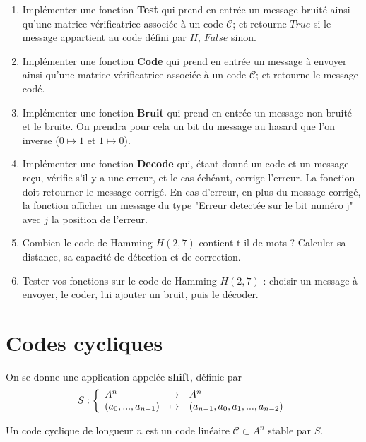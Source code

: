 \begin{enumerate}
\item Implémenter une fonction \textbf{Test} qui prend en entrée un message bruité ainsi qu'une matrice vérificatrice associée à un code $\mathcal C$; et retourne $True$ si le message appartient au code défini par $H$, $False$ sinon.
\item Implémenter une fonction \textbf{Code} qui prend en entrée un message à envoyer ainsi qu'une matrice vérificatrice associée à un code $\mathcal C$; et retourne le message codé.
\item Implémenter une fonction \textbf{Bruit} qui prend en entrée un message non bruité et le bruite. On prendra pour cela un bit du message au hasard que l'on inverse ($0\mapsto 1$ et $1\mapsto 0$).
\item Implémenter une fonction \textbf{Decode} qui, étant donné un code et un message reçu, vérifie s'il y a une erreur, et le cas échéant, corrige l'erreur. La fonction doit retourner le message corrigé. En cas d'erreur, en plus du message corrigé, la fonction afficher un message du type "Erreur detectée sur le bit numéro j" avec $j$ la position de l'erreur.
\item Combien le code de Hamming $H(2,7)$ contient-t-il de mots ? Calculer sa distance, sa capacité de détection et de correction.
\item Tester vos fonctions sur le code de Hamming $H(2,7)$ : choisir un message à envoyer, le coder, lui ajouter un bruit, puis le décoder.
\end{enumerate}

\section{Codes cycliques}

On se donne une application appelée \textbf{shift}, définie par 
\[S :\left\{\begin{array}{lcl}\mathcal  \mathcal A^n &\rightarrow & A^n\\
	(a_0,...,a_{n-1}) & \mapsto & (a_{n-1},a_0, a_1,..., a_{n-2})\end{array}\right.\]
\begin{definition}
Un code cyclique de longueur $n$ est un code linéaire $\mathcal C \subset A^n$ stable par $S$.
\end{definition}

